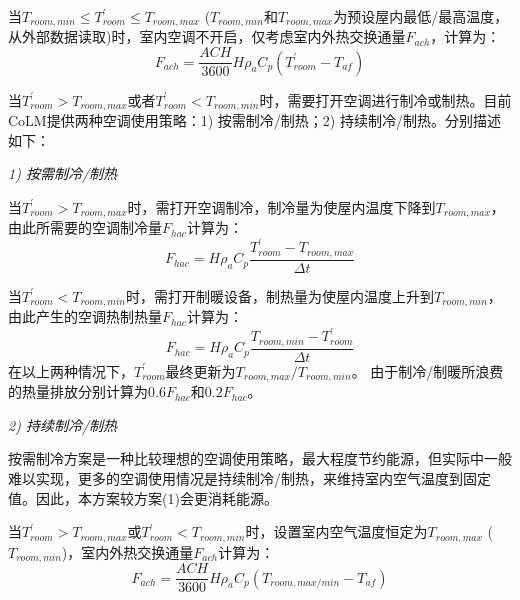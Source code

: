 当$T_{room,min}\le T_{room}^\prime \le T_{room,max} $ ($T_{room,min}$和$T_{room,max}$为预设屋内最低/最高温度，从外部数据读取)时，室内空调不开启，仅考虑室内外热交换通量$F_{ach}$，计算为：
\begin{equation}
F_{a c h}=\frac{ACH}{3600} H \rho_{a} C_{p}\left(T_{{room }}^{\prime}-T_{a f}\right)
\end{equation}

当$T_{room}^\prime>T_{room,max}$或者$T_{room}^\prime<T_{room,min}$时，需要打开空调进行制冷或制热。目前CoLM提供两种空调使用策略：1) 按需制冷/制热；2) 持续制冷/制热。分别描述如下：

\textit{1) 按需制冷/制热}

当$T_{room}^\prime>T_{room,max}$时，需打开空调制冷，制冷量为使屋内温度下降到$T_{room,max}$，由此所需要的空调制冷量$F_{hac}$计算为：
\begin{equation}
F_{{hac }}=H \rho_{a} C_{p} \frac{T_{{room }}^{\prime}-T_{{room,max }}}{\Delta t}
\end{equation}

当$T_{room}^\prime<T_{room,min}$时，需打开制暖设备，制热量为使屋内温度上升到$T_{room,min}$，由此产生的空调热制热量$F_{hac}$计算为：
\begin{equation}
F_{h a c}=H \rho_{a} C_{p} \frac{T_{{room,min }} -T_{{room }}^{\prime}}{\Delta t}
\end{equation}
在以上两种情况下，$T_{room}^\prime$最终更新为$T_{room,max}/T_{room,min}$。
由于制冷/制暖所浪费的热量排放分别计算为$0.6F_{hac}$和$0.2F_{hac}$。

\textit{2) 持续制冷/制热}

按需制冷方案是一种比较理想的空调使用策略，最大程度节约能源，但实际中一般难以实现，更多的空调使用情况是持续制冷/制热，来维持室内空气温度到固定值。因此，本方案较方案(1)会更消耗能源。

当$T_{room}^\prime>T_{room,max}$或$T_{room}^\prime<T_{room,min}$时，设置室内空气温度恒定为$T_{room,max}$ \allowbreak($T_{room,min}$)，室内外热交换通量$F_{ach}$计算为：
\begin{equation}
F_{a c h}=\frac{ACH}{3600} H \rho_{a} C_{p}\left(T_{{room,max/min}}-T_{a f}\right)
\end{equation}


